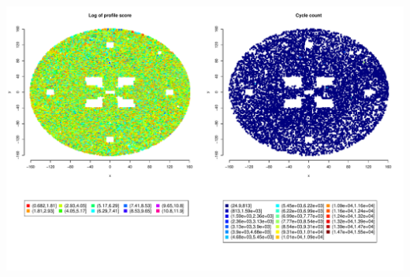 \documentclass[notitlepage,a4paper]{article}\usepackage[]{graphicx}\usepackage[]{color}
\makeatletter
\def\maxwidth{ %
  \ifdim\Gin@nat@width>\linewidth
    \linewidth
  \else
    \Gin@nat@width
  \fi
}
\newenvironment{knitrout}{}{} %
\makeatother
\begin{document}
\begin{knitrout}
\color{fgcolor}
\includegraphics[width=\maxwidth]{figure/unnamed-chunk-6-1} 

\end{knitrout}
\end{document}
